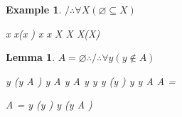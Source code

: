 \documentclass[10pt,a4paper]{book}
\let\emptyset\varnothing
\newtheorem{lemma}{Lemma}[section]
\newtheorem{example}{Example}[section]
\begin{document}
\begin{example}
    $/\therefore \forall X(\emptyset \subseteq X)$
    \begin{fitchproof}[arrayenv=tabular]
        \open
         {x \in \emptyset}                                
         {\forall x(x \notin \emptyset)}                  
         {x \notin \emptyset}                           
         {\bot}                                          
         {x \in X  }                                        
        \close
         {\emptyset \subseteq X}                       
         {\forall X(\emptyset \subseteq X)}             
    \end{fitchproof}
\end{example}

\begin{lemma}
    \label{emptyset}
    $A = \emptyset \therefore / \therefore \forall y( y \notin A)$
    \begin{fitchproof}[arrayenv=tabular]
         {\forall y (y \notin A )}                                
        \open
         {y \in A }                                               
         {y \notin A }                                            
         {\bot}                                                  
         {y \in \emptyset }                                       
        \close
        \open
         {y \in \emptyset }                                      
         {\forall y (y \notin \emptyset  )}                        
         {y \notin \emptyset  }                                    
         {\bot}                                                 
         {y \in A}                                                 
        \close
         {A = \emptyset }                                                    
    \end{fitchproof}

    \begin{fitchproof}[arrayenv=tabular]
         {A = \emptyset }                                                    
         {\forall y (y \notin \emptyset )}                                
         {\forall y (y \notin A )}                                
    \end{fitchproof}
\end{lemma}
\end{document}
